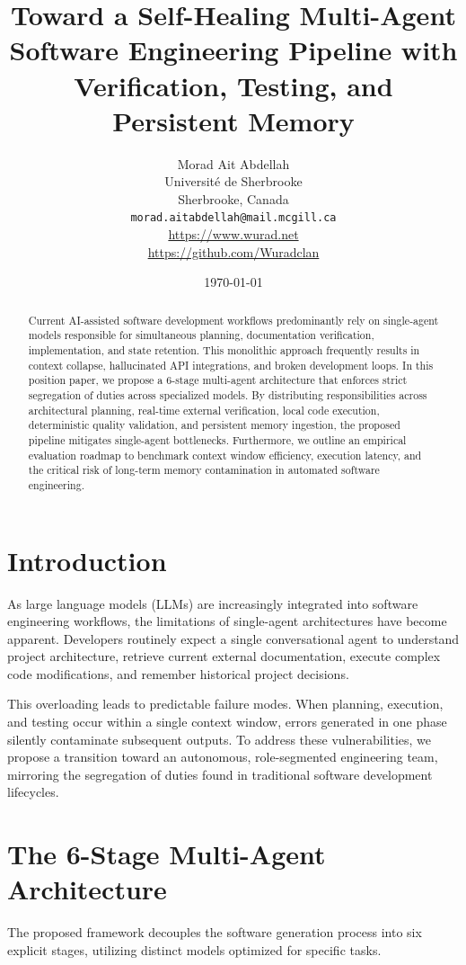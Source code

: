 \documentclass[11pt,a4paper]{article}
\title{\textbf{Toward a Self-Healing Multi-Agent Software Engineering Pipeline with Verification, Testing, and Persistent Memory}}
\author{
  Morad Ait Abdellah \\
  Université de Sherbrooke \\
  Sherbrooke, Canada \\
  \texttt{morad.aitabdellah@mail.mcgill.ca} \\
  \url{https://www.wurad.net} \\
  \url{https://github.com/Wuradclan}
}
\date{\today}
\begin{document}
\maketitle

\begin{abstract}
Current AI-assisted software development workflows predominantly rely on single-agent models responsible for simultaneous planning, documentation verification, implementation, and state retention. This monolithic approach frequently results in context collapse, hallucinated API integrations, and broken development loops. In this position paper, we propose a 6-stage multi-agent architecture that enforces strict segregation of duties across specialized models. By distributing responsibilities across architectural planning, real-time external verification, local code execution, deterministic quality validation, and persistent memory ingestion, the proposed pipeline mitigates single-agent bottlenecks. Furthermore, we outline an empirical evaluation roadmap to benchmark context window efficiency, execution latency, and the critical risk of long-term memory contamination in automated software engineering.
\end{abstract}

\section{Introduction}
As large language models (LLMs) are increasingly integrated into software engineering workflows, the limitations of single-agent architectures have become apparent. Developers routinely expect a single conversational agent to understand project architecture, retrieve current external documentation, execute complex code modifications, and remember historical project decisions.

This overloading leads to predictable failure modes. When planning, execution, and testing occur within a single context window, errors generated in one phase silently contaminate subsequent outputs. To address these vulnerabilities, we propose a transition toward an autonomous, role-segmented engineering team, mirroring the segregation of duties found in traditional software development lifecycles.

\section{The 6-Stage Multi-Agent Architecture}
The proposed framework decouples the software generation process into six explicit stages, utilizing distinct models optimized for specific tasks. 
\end{document}
